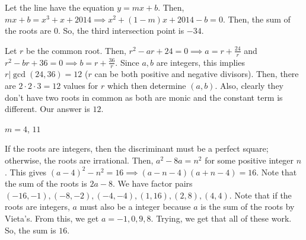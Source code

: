 \documentclass[11pt]{article}
\begin{document}

\begin{sol}
Let the line have the equation $y=mx+b$. Then, $mx+b=x^3+x+2014\implies x^2+(1-m)x+2014-b=0$. Then, the sum of the roots are $0$. So, the third intersection point is $\boxed{-34}$.
\end{sol}


\begin{sol}
Let $r$ be the common root. Then, $r^2-ar+24=0\implies a = r + \frac{24}{r}$ and $r^2-br+36=0\implies b = r + \frac{36}{r}$. Since $a,b$ are integers, this implies $r|\gcd(24,36)=12$ ($r$ can be both positive and negative divisors). Then, there are $2\cdot 2\cdot 3 =12$ values for $r$ which then determine $(a,b)$. Also, clearly they don't have two roots in common as both are monic and the constant term is different. Our answer is $\boxed{12}$.
\end{sol}


\begin{sol}
$m=4$, $\boxed{11}$
\end{sol}


\begin{sol}
If the roots are integers, then the discriminant must be a perfect square; otherwise, the roots are irrational. Then, $a^2-8a=n^2$ for some positive integer $n$. This gives $(a-4)^2-n^2=16\implies (a-n-4)(a+n-4)=16$. Note that the sum of the roots is $2a-8$. We have factor pairs $(-16,-1),(-8,-2),(-4,-4),(1,16),(2,8),(4,4)$. Note that if the roots are integers, $a$ must also be a integer because $a$ is the sum of the roots by Vieta's. From this, we get $a=-1, 0, 9, 8$. Trying, we get that all of these work. So, the sum is $\boxed{16}$.
\end{sol}
\end{document}
